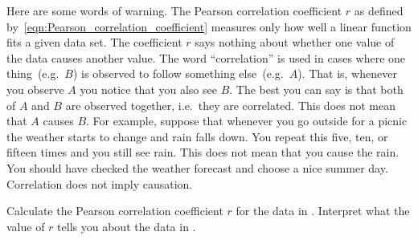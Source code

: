 \documentclass[a4paper,oneside,12pt]{article}
\begin{document}
Here are some words of warning.  The Pearson correlation coefficient
$r$ as defined by~\eqref{eqn:Pearson_correlation_coefficient} measures
only how well a linear function fits a given data set.  The
coefficient $r$ says nothing about whether one value of the data
causes another value.  The word ``correlation'' is used in cases where
one thing~(e.g.~$B$) is observed to follow something else~(e.g.~$A$).
That is, whenever you observe $A$ you notice that you also see $B$.
The best you can say is that both of $A$ and $B$ are observed
together, i.e.~they are correlated.  This does not mean that $A$
causes $B$.  For example, suppose that whenever you go outside for a
picnic the weather starts to change and rain falls down.  You repeat
this five, ten, or fifteen times and you still see rain.  This does
not mean that you cause the rain.  You should have checked the weather
forecast and choose a nice summer day.  Correlation does not imply
causation.

\begin{table}[!htbp]
\centering

\caption{%
  Detailed calculation of the Pearson correlation coefficient for the
  data in .  All numbers have been rounded to
  at most two decimal places in order to fit the table.  However, you
  should avoid rounding intermediate results.  Only the final numbers
  should be rounded.
}
\label{tab:height_weight_Pearson_r}
\end{table}

\begin{example}
Calculate the Pearson correlation coefficient $r$ for the data in
.  Interpret what the value of $r$ tells you
about the data in .
\end{example}
\end{document}
